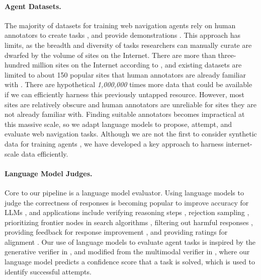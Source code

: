 \paragraph{Agent Datasets.} The majority of datasets for training web navigation agents rely on human annotators to create tasks \citep{WebArena,VisualWebArena,AndroidInTheWild}, and provide demonstrations \citep{Mind2Web,WebLINX,AndroidInTheWild,ScribeAgent}. This approach has limits, as the breadth and diversity of tasks researchers can manually curate are dwarfed by the volume of sites on the Internet. There are more than three-hundred million sites on the Internet according to \citet{CommonCrawl}, and existing datasets are limited to about 150 popular sites that human annotators are already familiar with \citep{Mind2Web,WebLINX,ScribeAgent}. There are hypothetical \textit{1,000,000} times more data that could be available if we can efficiently harness this previously untapped resource. However, most sites are relatively obscure and human annotators are unreliable for sites they are not already familiar with. Finding suitable annotators becomes impractical at this massive scale, so we adapt language models to propose, attempt, and evaluate web navigation tasks. Although we are not the first to consider synthetic data for training agents \citep{RetrieveAndTransform,SynatraSyntheticData,LLMSyntheticMathData,LLMSyntheticPreferenceData}, we have developed a key approach to harness internet-scale data efficiently.

\paragraph{Language Model Judges.} Core to our pipeline is a language model evaluator. Using language models to judge the correctness of responses is becoming popular to improve accuracy for LLMs \citep{LLMAsJudgeSurvey}, and applications include verifying reasoning steps \citep{GenerativeVerifiers}, rejection sampling \citep{ScalingTestTimeCompute,BestOfNSpeculativeRejection}, prioritizing frontier nodes in search algorithms \citep{LanguageAgentTreeSearch,LLMTreeSearch}, filtering out harmful responses \citep{LlamaGuard}, providing feedback for response improvement \citep{SelfRefine,Refiner,LLMSelfImprove,TextGrad}, and providing ratings for alignment \citep{RLAIF,RLHF}. Our use of language models to evaluate agent tasks is inspired by the generative verifier in \citet{GenerativeVerifiers}, and modified from the multimodal verifier in \citet{WebVoyager}, where our language model predicts a confidence score that a task is solved, which is used to identify successful attempts.